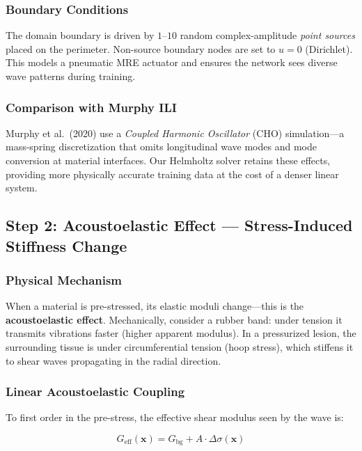 \documentclass[11pt,letterpaper]{article}
\newcommand{\xvec}{\bm{x}}
\newcommand{\Geff}{G_{\mathrm{eff}}}
\newcommand{\Gbg}{G_{\mathrm{bg}}}
\newcommand{\Dsig}{\Delta\sigma}
\begin{document}
\subsubsection{Boundary Conditions}

The domain boundary is driven by $1$--$10$ random complex-amplitude \emph{point sources}
placed on the perimeter. Non-source boundary nodes are set to $u = 0$ (Dirichlet). This
models a pneumatic MRE actuator and ensures the network sees diverse wave patterns during
training.

\subsubsection{Comparison with Murphy ILI}

Murphy et al.\ (2020) use a \emph{Coupled Harmonic Oscillator} (CHO) simulation---a
mass-spring discretization that omits longitudinal wave modes and mode conversion at
material interfaces. Our Helmholtz solver retains these effects, providing more
physically accurate training data at the cost of a denser linear system.

\subsection{Step 2: Acoustoelastic Effect --- Stress-Induced Stiffness Change}

\subsubsection{Physical Mechanism}

When a material is pre-stressed, its elastic moduli change---this is the
\textbf{acoustoelastic effect}. Mechanically, consider a rubber band: under tension it
transmits vibrations faster (higher apparent modulus). In a pressurized lesion, the
surrounding tissue is under circumferential tension (hoop stress), which stiffens it to
shear waves propagating in the radial direction.

\subsubsection{Linear Acoustoelastic Coupling}

To first order in the pre-stress, the effective shear modulus seen by the wave is:

\begin{physicbox}
\begin{equation}\label{eq:acoustoelastic}
    \Geff(\xvec) = \Gbg + A \cdot \Dsig(\xvec)
\end{equation}
\end{physicbox}
\end{document}
